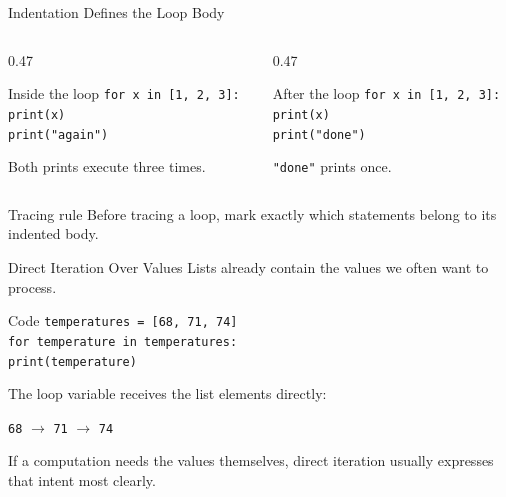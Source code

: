 \documentclass[aspectratio=169,10pt]{beamer}
\begin{document}
\begin{frame}{Indentation Defines the Loop Body}
  \begin{columns}[T,onlytextwidth]
    \begin{column}{0.47\textwidth}
      \begin{block}{Inside the loop}
        \texttt{for x in [1, 2, 3]:}\\
        \hspace{0.18in}\texttt{print(x)}\\
        \hspace{0.18in}\texttt{print("again")}
      \end{block}

      Both prints execute three times.
    \end{column}
    \begin{column}{0.47\textwidth}
      \begin{block}{After the loop}
        \texttt{for x in [1, 2, 3]:}\\
        \hspace{0.18in}\texttt{print(x)}\\
        \texttt{print("done")}
      \end{block}

      \texttt{"done"} prints once.
    \end{column}
  \end{columns}

  \begin{alertblock}{Tracing rule}
    Before tracing a loop, mark exactly which statements belong to its indented body.
  \end{alertblock}
\end{frame}


\begin{frame}{Direct Iteration Over Values}
  Lists already contain the values we often want to process.

  \begin{block}{Code}
    \texttt{temperatures = [68, 71, 74]}\\
    \texttt{for temperature in temperatures:}\\
    \hspace{0.20in}\texttt{print(temperature)}
  \end{block}

  The loop variable receives the list elements directly:

  \begin{center}
    \texttt{68} $\rightarrow$ \texttt{71} $\rightarrow$ \texttt{74}
  \end{center}

  \begin{keyidea}
    If a computation needs the values themselves, direct iteration usually expresses that intent most clearly.
  \end{keyidea}
\end{frame}
\end{document}
